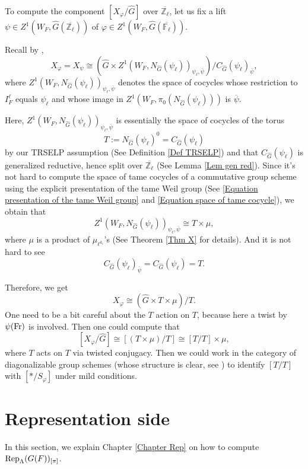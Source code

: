To compute the component $[X_{\varphi}/\hat{G}]$ over $\overline{\mathbb{Z}_{\ell}}$, let us fix a lift $\psi \in Z^1(W_F, \hat{G}(\overline{\mathbb{Z}_{\ell}}))$ of $\varphi \in Z^1(W_F, \hat{G}(\overline{\mathbb{F}_{\ell}}))$.

Recall by \cite[Subsection 4.6]{dat2022ihes},
$$X_{\varphi}=X_{\psi} \cong \left(\hat{G} \times Z^1(W_F, N_{\hat{G}}(\psi_{\ell}))_{\psi_{\ell}, \overline{\psi}}\right)/C_{\hat{G}}(\psi_{\ell})_{\overline{\psi}},$$
where $Z^1(W_F, N_{\hat{G}}(\psi_{\ell}))_{\psi_{\ell}, \overline{\psi}}$  denotes the space of cocycles whose restriction to $I_F^{\ell}$ equals $\psi_{\ell}$ and whose image in $Z^1(W_F, \pi_0(N_{\hat{G}}(\psi_{\ell})))$ is $\overline{\psi}$. 

Here, $Z^1(W_F, N_{\hat{G}}(\psi_{\ell}))_{\psi_{\ell}, \overline{\psi}}$ is essentially the space of cocycles of the torus $$T:=N_{\hat{G}}(\psi_{\ell})^0=C_{\hat{G}}(\psi_{\ell})$$
by our TRSELP assumption (See Definition \ref{Def TRSELP}) and that $C_{\hat{G}}(\psi_{\ell})$ is generalized reductive, hence split over $\overline{\mathbb{Z}_{\ell}}$ (See Lemma \ref{Lem gen red}). Since it's not hard to compute the space of tame cocycles of a commutative group scheme using the explicit presentation of the tame Weil group (See \ref{Equation presentation of the tame Weil group} and \ref{Equation space of tame cocycle}), we obtain that 
$$Z^1(W_F, N_{\hat{G}}(\psi_{\ell}))_{\psi_{\ell}, \overline{\psi}} \cong T \times \mu,$$
where $\mu$ is a product of $\mu_{\ell^{k_i}}$'s (See Theorem \ref{Thm X} for details).
And it is not hard to see 
$$C_{\hat{G}}(\psi_{\ell})_{\overline{\psi}}=C_{\hat{G}}(\psi_{\ell})=T.$$

Therefore, we get 
$$X_{\varphi} \cong \left(\hat{G} \times T \times \mu\right)/T.$$
One need to be a bit careful about the $T$ action on $T$, because here a twist by $\psi(\operatorname{Fr})$ is involved. Then one could compute that 
$$[X_{\varphi}/\hat{G}] \cong [\left(T \times \mu\right)/T] \cong [T/T] \times \mu,$$
where $T$ acts on $T$ via twisted conjugacy. Then we could work in the category of diagonalizable group schemes (whose structure is clear, see \cite[p70, Section 5]{brochard2014autour}) to identify $[T/T]$ with $[*/S_{\varphi}]$ under mild conditions.

\section{Representation side}
In this section, we explain Chapter \ref{Chapter Rep} on how to compute $\operatorname{\operatorname{Rep}}_{\Lambda}(G(F))_{[\pi]}$.

